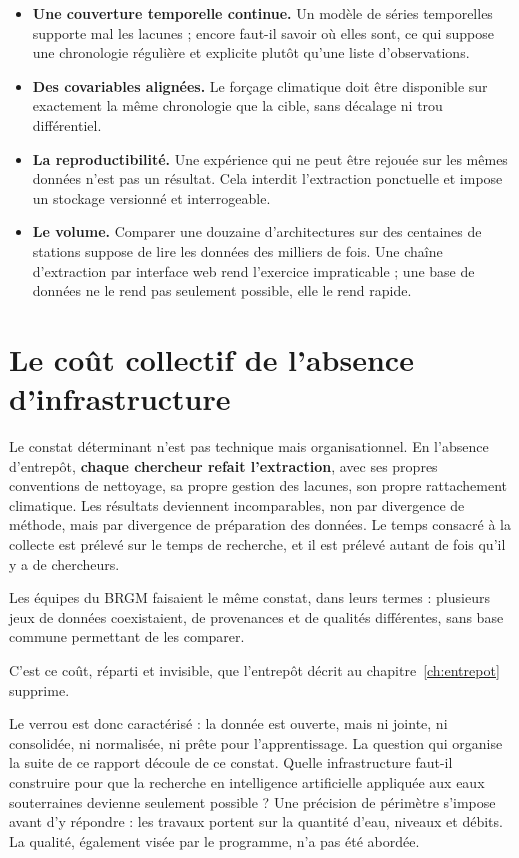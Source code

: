 \begin{itemize}
  \item \textbf{Une couverture temporelle continue.} Un modèle de séries temporelles supporte
  mal les lacunes ; encore faut-il savoir où elles sont, ce qui suppose une chronologie
  régulière et explicite plutôt qu'une liste d'observations.
  \item \textbf{Des covariables alignées.} Le forçage climatique doit être disponible sur
  exactement la même chronologie que la cible, sans décalage ni trou différentiel.
  \item \textbf{La reproductibilité.} Une expérience qui ne peut être rejouée sur les mêmes
  données n'est pas un résultat. Cela interdit l'extraction ponctuelle et impose un stockage
  versionné et interrogeable.
  \item \textbf{Le volume.} Comparer une douzaine d'architectures sur des centaines de stations
  suppose de lire les données des milliers de fois. Une chaîne d'extraction par interface web
  rend l'exercice impraticable ; une base de données ne le rend pas seulement possible, elle le
  rend rapide.
\end{itemize}

\section{Le coût collectif de l'absence d'infrastructure}

Le constat déterminant n'est pas technique mais organisationnel. En l'absence d'entrepôt,
\textbf{chaque chercheur refait l'extraction}, avec ses propres conventions de nettoyage, sa
propre gestion des lacunes, son propre rattachement climatique. Les résultats deviennent
incomparables, non par divergence de méthode, mais par divergence de préparation des données.
Le temps consacré à la collecte est prélevé sur le temps de recherche, et il est prélevé autant
de fois qu'il y a de chercheurs.

Les équipes du BRGM faisaient le même constat, dans leurs termes : plusieurs jeux de données
coexistaient, de provenances et de qualités différentes, sans base commune permettant de les
comparer.

C'est ce coût, réparti et invisible, que l'entrepôt décrit au chapitre~\ref{ch:entrepot}
supprime.

Le verrou est donc caractérisé : la donnée est ouverte, mais ni jointe, ni consolidée, ni
normalisée, ni prête pour l'apprentissage. La question qui organise la suite de ce rapport
découle de ce constat. Quelle infrastructure faut-il construire pour que la recherche en
intelligence artificielle appliquée aux eaux souterraines devienne seulement possible ? Une
précision de périmètre s'impose avant d'y répondre : les travaux portent sur la quantité d'eau,
niveaux et débits. La qualité, également visée par le programme, n'a pas été abordée.
